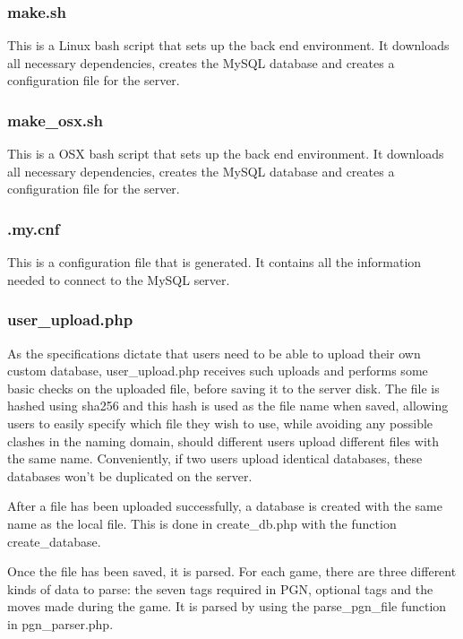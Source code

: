 \documentclass{article}
\begin{document}
\subsubsection{make.sh}
This is a Linux bash script that sets up the back end environment.
It downloads all necessary dependencies, creates the MySQL database
and creates a configuration file for the server.

\subsubsection{make\_osx.sh}
This is a OSX bash script that sets up the back end environment.
It downloads all necessary dependencies, creates the MySQL database and
creates a configuration file for the server.

\subsubsection{.my.cnf}
This is a configuration file that is generated. It contains all the
information needed to connect to the MySQL server.

\subsubsection{user\_upload.php}
As the specifications dictate that users need to be able to upload their own
custom database, user\_upload.php receives such uploads and
performs some basic checks on the uploaded file, before saving it to the
server disk. The file is hashed using sha256\cite{sha} and this hash is used
as
the file name when saved, allowing users to easily specify which file
they wish to use, while avoiding any possible clashes in the naming
domain, should different users upload different files with the same name.
Conveniently, if two users upload identical databases, these databases
won't be duplicated on the server.

After a file has been uploaded successfully, a database is created with
the same name as the local file. This is done in create\_db.php with
the function create\_database.

Once the file has been saved, it is parsed. For each game, there are
three different kinds of data to parse: the seven tags required in PGN,
optional tags and the moves made during the game. It is parsed by
using the parse\_pgn\_file function in pgn\_parser.php.
\end{document}
